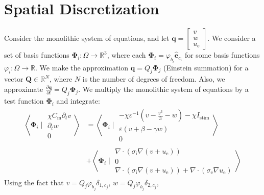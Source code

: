 \documentclass{article}
\newcommand{\bvec}[1]{\boldsymbol{#1}}
\newcommand{\brvec}[1]{\mathbf{#1}}
\begin{document}
\newpage
\section{Spatial Discretization}

Consider the monolithic system of equations,
and let $\bvec{q} = \begin{bmatrix}
    v \\
    w \\
    u_\text{e}
\end{bmatrix}$.
We consider a set of basis functions $\bvec{\Phi}_i : \Omega \rightarrow \mathbb{R}^3$,
where each $\bvec{\Phi}_i = \varphi_{b_i} \hat{\brvec{e}}_{c_i}$
for some basis functions $\varphi_i : \Omega \rightarrow \mathbb{R}$.
We make the approximation $\bvec{q} = Q_j \bvec{\Phi}_j$ (Einstein summation)
for a vector $\bvec{Q} \in \mathbb{R}^N$, where $N$ is the number of degrees of freedom.
Also, we approximate $\frac{\partial \bvec{q}}{\partial t} = \dot{Q}_j \bvec{\Phi}_j$.
We multiply the monolithic system of equations by a test function $\bvec{\Phi}_i$ and integrate:
\begin{align*}
    \left< \bvec{\Phi}_i \mid \begin{matrix}
            \chi C_\text{m} \partial_t v \\
            \partial_t w \\
            0
        \end{matrix} \right>
        & = \left< \bvec{\Phi}_i \mid \begin{matrix}
                -\chi \varepsilon^{-1} (v - \frac{v^3}{3} - w)
                    - \chi I_\text{stim} \\
                \varepsilon (v + \beta - \gamma w) \\
                0
            \end{matrix} \right> \\
        \qquad & + \left< \bvec{\Phi}_i \mid \begin{matrix}
                \nabla \cdot (\sigma_\text{i} \nabla (v + u_\text{e})) \\
                0 \\
                \nabla \cdot (\sigma_\text{i} \nabla (v + u_\text{e}))
                    + \nabla \cdot (\sigma_\text{e} \nabla u_\text{e})
            \end{matrix} \right>
\end{align*}
\noindent Using the fact that $v = Q_j \varphi_{b_j} \delta_{1, c_j}$,
$w = Q_j \varphi_{b_j} \delta_{2, c_j}$,
\end{document}
